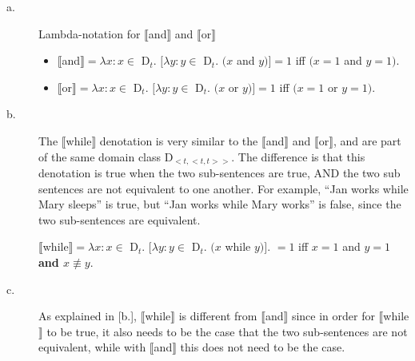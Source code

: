 \documentclass[11pt]{article}
\begin{document}
\begin{solution}
\begin{description}
    \item[a.] Lambda-notation for $\llbracket$and$\rrbracket$ and $\llbracket$or$\rrbracket$  

        \begin{itemize}
            \item $\llbracket$and$\rrbracket = \lambda x: x \in $ D$_{t}.$ $[ \lambda y: y \in $ D$_{t}.$ $(x $ and $ y)]= 1$ iff $(x=1$ and $y=1)$.

            \item $\llbracket$or$\rrbracket = \lambda x: x \in $ D$_{t}.$ $[ \lambda y: y \in $ D$_{t}.$ $(x $ or $ y)]= 1$ iff $(x=1$ or $y=1)$.
        \end{itemize}

    \item[b.] The $\llbracket$while$\rrbracket$ denotation is very similar to the $\llbracket$and$\rrbracket$ and $\llbracket$or$\rrbracket$, and are part of the same domain class D$_{<t, <t, t>>}$.  The difference is that this denotation is true when the two sub-sentences are true, AND the two sub sentences are not equivalent to one another.  For example, ``Jan works while Mary sleeps'' is true, but ``Jan works while Mary works'' is false, since the two sub-sentences are equivalent.

    $\llbracket$while$\rrbracket = \lambda x: x \in $ D$_{t}.$ $[ \lambda y: y \in $ D$_{t}.$ $(x $ while $ y)].$ $= 1$ iff $x=1$ and $y=1$ \textbf{and $x \not\equiv y$}.

    \item[c.]  As explained in [b.], $\llbracket$while$\rrbracket$ is different from $\llbracket$and$\rrbracket$ since in order for $\llbracket$while$\rrbracket$ to be true, it also needs to be the case that the two sub-sentences are not equivalent, while with $\llbracket$and$\rrbracket$ this does not need to be the case.

\end{description}

\end{solution}

\vspace*{0.5cm} %
\end{document}
